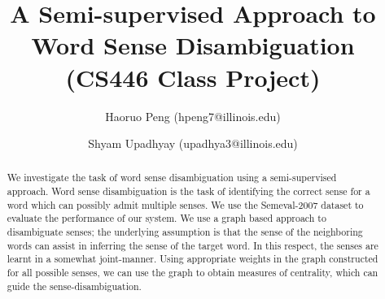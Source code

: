 \documentclass[12pt,letterpaper]{article}
\newcommand{\blue}[1]{\textcolor{RoyalBlue}{#1}}
\newcommand{\instructions}[1]{\blue{\textit{#1}}}
\begin{document}
\title{A Semi-supervised Approach to Word Sense Disambiguation \\ \Large{(CS446 Class Project)}}
\author{Haoruo Peng (hpeng7@illinois.edu) \and Shyam Upadhyay (upadhya3@illinois.edu)}
\maketitle
\begin{abstract}
We investigate the task of word sense disambiguation using a semi-supervised approach. Word sense disambiguation is the task of identifying the correct sense for a word which can possibly admit multiple senses. We use the Semeval-2007 dataset to evaluate the performance of our system. We use a graph based approach to disambiguate senses; the underlying assumption is that the sense of the neighboring words can assist in inferring the sense of the target word. In this respect, the senses are learnt in a somewhat joint-manner. Using appropriate weights in the graph constructed for all possible senses, we can use the graph to obtain measures of centrality, which can guide the sense-disambiguation.
\end{abstract}
\end{document}
